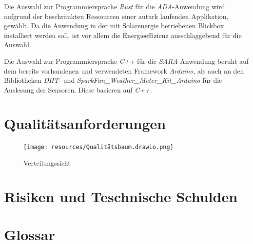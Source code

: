 \documentclass[
]{article}
\begin{document}
Die Auswahl zur Programmiersprache \textit{Rust} für die \textit{ADA}-Anwendung wird aufgrund der beschränkten Ressourcen einer autark laufenden Applikation, gewählt.
Da die Anwendung in der mit Solarenergie betriebenen Blickbox installiert werden soll, ist vor allem die Energieeffizienz ausschlaggebend für die Auswahl.

Die Auswahl zur Programmiersprache \textit{C++} für die \textit{SARA}-Anwendung beruht auf dem bereits vorhandenen und verwendeten Framework \textit{Arduino}, als auch an den Bibliotheken \textit{DHT}- und \textit{SparkFun\_Weather\_Meter\_Kit\_Arduino} für die Auslesung der Sensoren. Diese basieren auf \textit{C++}.


\section{Qualitätsanforderungen}
\begin{figure}[htbp]
	\centering
	\texttt{[image: resources/Qualitätsbaum.drawio.png]}
	\caption{Verteilungssicht}
	\label{fig:Verteilungssicht}
\end{figure}  

\section{Risiken und Teschnische Schulden}
\section{Glossar}
\end{document}
